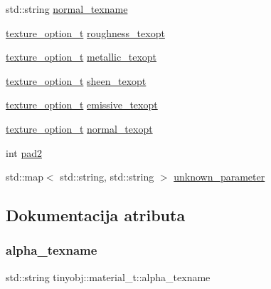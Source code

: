 \begin{DoxyCompactItemize}
std\+::string \hyperlink{structtinyobj_1_1material__t_a7512ccf46044357bea1739d583871578}{normal\+\_\+texname}
\item 
\hyperlink{structtinyobj_1_1texture__option__t}{texture\+\_\+option\+\_\+t} \hyperlink{structtinyobj_1_1material__t_aa02a56f4de95ab212e19a5d77b1f2d91}{roughness\+\_\+texopt}
\item 
\hyperlink{structtinyobj_1_1texture__option__t}{texture\+\_\+option\+\_\+t} \hyperlink{structtinyobj_1_1material__t_abbae6c6e634f9899c3974731c554be21}{metallic\+\_\+texopt}
\item 
\hyperlink{structtinyobj_1_1texture__option__t}{texture\+\_\+option\+\_\+t} \hyperlink{structtinyobj_1_1material__t_a60a907d53aed60591b8d78ae220c7c4a}{sheen\+\_\+texopt}
\item 
\hyperlink{structtinyobj_1_1texture__option__t}{texture\+\_\+option\+\_\+t} \hyperlink{structtinyobj_1_1material__t_a7a2da381cdabd6655aaed320d5b1ffe3}{emissive\+\_\+texopt}
\item 
\hyperlink{structtinyobj_1_1texture__option__t}{texture\+\_\+option\+\_\+t} \hyperlink{structtinyobj_1_1material__t_aa0087d1bfcaf0a195f8c244970c2ef4e}{normal\+\_\+texopt}
\item 
int \hyperlink{structtinyobj_1_1material__t_a84cd388a80784aaaac4a03267d77f994}{pad2}
\item 
std\+::map$<$ std\+::string, std\+::string $>$ \hyperlink{structtinyobj_1_1material__t_a18b700227c94d410ed1aa550c7fa9226}{unknown\+\_\+parameter}
\end{DoxyCompactItemize}


\subsection{Dokumentacija atributa}
\mbox{\label{structtinyobj_1_1material__t_a1b0225fd76de506f089fdedbf2c66dec}} 
\subsubsection{\texorpdfstring{alpha\+\_\+texname}{alpha\_texname}}
{\footnotesize\ttfamily std\+::string tinyobj\+::material\+\_\+t\+::alpha\+\_\+texname}

\mbox{\label{structtinyobj_1_1material__t_adb6fdf38b462c4bd91fc2927282a3fc1}} 
